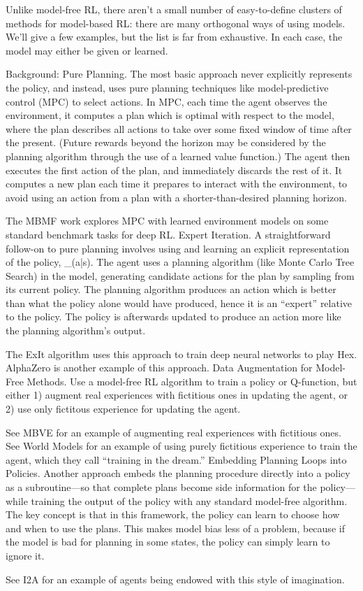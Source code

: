 

Unlike model-free RL, there aren’t a small number of easy-to-define clusters of methods for model-based RL: there are many orthogonal ways of using models. We’ll give a few examples, but the list is far from exhaustive. In each case, the model may either be given or learned.

Background: Pure Planning. The most basic approach never explicitly represents the policy, and instead, uses pure planning techniques like model-predictive control (MPC) to select actions. In MPC, each time the agent observes the environment, it computes a plan which is optimal with respect to the model, where the plan describes all actions to take over some fixed window of time after the present. (Future rewards beyond the horizon may be considered by the planning algorithm through the use of a learned value function.) The agent then executes the first action of the plan, and immediately discards the rest of it. It computes a new plan each time it prepares to interact with the environment, to avoid using an action from a plan with a shorter-than-desired planning horizon.

The MBMF work explores MPC with learned environment models on some standard benchmark tasks for deep RL.
Expert Iteration. A straightforward follow-on to pure planning involves using and learning an explicit representation of the policy, \pi_{\theta}(a|s). The agent uses a planning algorithm (like Monte Carlo Tree Search) in the model, generating candidate actions for the plan by sampling from its current policy. The planning algorithm produces an action which is better than what the policy alone would have produced, hence it is an “expert” relative to the policy. The policy is afterwards updated to produce an action more like the planning algorithm’s output.

The ExIt algorithm uses this approach to train deep neural networks to play Hex.
AlphaZero is another example of this approach.
Data Augmentation for Model-Free Methods. Use a model-free RL algorithm to train a policy or Q-function, but either 1) augment real experiences with fictitious ones in updating the agent, or 2) use only fictitous experience for updating the agent.

See MBVE for an example of augmenting real experiences with fictitious ones.
See World Models for an example of using purely fictitious experience to train the agent, which they call “training in the dream.”
Embedding Planning Loops into Policies. Another approach embeds the planning procedure directly into a policy as a subroutine—so that complete plans become side information for the policy—while training the output of the policy with any standard model-free algorithm. The key concept is that in this framework, the policy can learn to choose how and when to use the plans. This makes model bias less of a problem, because if the model is bad for planning in some states, the policy can simply learn to ignore it.

See I2A for an example of agents being endowed with this style of imagination.